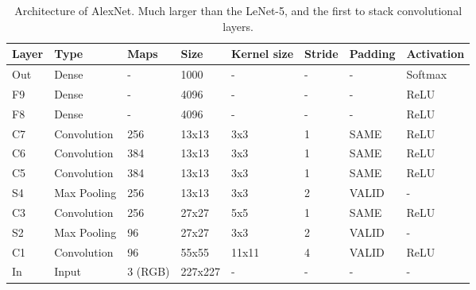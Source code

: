 \documentclass[12pt,a4paper]{article}
\begin{document}
\begin{table}
  \centering
    \begin{tabular}{|l|l|l|l|l|l|l|l|}
      \hline
      Layer &Type &Maps &Size&Kernel size & Stride &Padding &Activation  \\
      \hline
      Out &Dense &- &1000 &-  & - &- &Softmax  \\
      F9 &Dense & - & 4096 &- &- &- &ReLU \\
      F8 & Dense & - & 4096 &- &- &- &ReLU \\
      C7 & Convolution & 256 & 13x13 & 3x3 & 1 & SAME & ReLU \\
      C6 & Convolution & 384 & 13x13 & 3x3 & 1 & SAME & ReLU \\
      C5 & Convolution & 384 & 13x13 & 3x3 & 1 & SAME & ReLU \\
      S4 & Max Pooling & 256 & 13x13 & 3x3 & 2 & VALID & -   \\
      C3 & Convolution & 256 & 27x27 & 5x5 & 1 & SAME & ReLU \\
      S2 & Max Pooling & 96  & 27x27 & 3x3 & 2 & VALID & - \\
      C1 & Convolution & 96  & 55x55 & 11x11 & 4 & VALID & ReLU \\
      In & Input       & 3 (RGB) & 227x227  &- &- &- &- \\
      \hline
    \end{tabular}
  \caption[Architecture of AlexNet]{Architecture of AlexNet. Much larger than the LeNet-5, and the first to stack convolutional layers.}
  \label{tab:alexnet}
\end{table}
\end{document}
